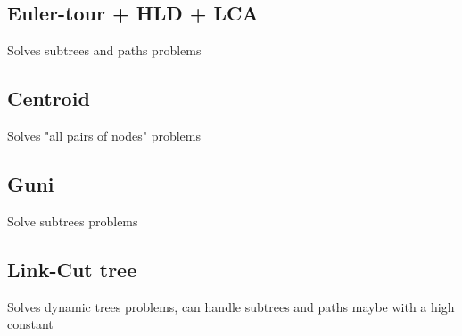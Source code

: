 \subsection{Euler-tour + HLD + LCA }

Solves subtrees and paths problems \\


\subsection{Centroid }

Solves "all pairs of nodes" problems \\


\subsection{Guni }

Solve subtrees problems\\


\subsection{Link-Cut tree }

Solves dynamic trees problems, can handle subtrees and paths maybe with a high constant\\
